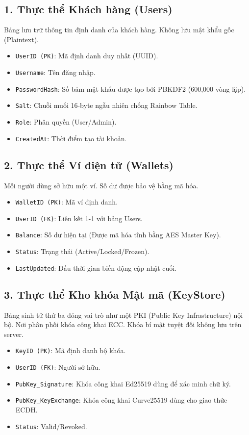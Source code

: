\documentclass[11pt,a4paper]{article}
\begin{document}
\subsection{1. Thực thể Khách hàng (Users)}
Bảng lưu trữ thông tin định danh của khách hàng. Không lưu mật khẩu gốc (Plaintext).
\begin{itemize}[noitemsep]
    \item \texttt{UserID (PK)}: Mã định danh duy nhất (UUID).
    \item \texttt{Username}: Tên đăng nhập.
    \item \texttt{PasswordHash}: Số băm mật khẩu được tạo bởi PBKDF2 (600,000 vòng lặp).
    \item \texttt{Salt}: Chuỗi muối 16-byte ngẫu nhiên chống Rainbow Table.
    \item \texttt{Role}: Phân quyền (User/Admin).
    \item \texttt{CreatedAt}: Thời điểm tạo tài khoản.
\end{itemize}

\subsection{2. Thực thể Ví điện tử (Wallets)}
Mỗi người dùng sở hữu một ví. Số dư được bảo vệ bằng mã hóa.
\begin{itemize}[noitemsep]
    \item \texttt{WalletID (PK)}: Mã ví định danh.
    \item \texttt{UserID (FK)}: Liên kết 1-1 với bảng Users.
    \item \texttt{Balance}: Số dư hiện tại (Được mã hóa tĩnh bằng AES Master Key).
    \item \texttt{Status}: Trạng thái (Active/Locked/Frozen).
    \item \texttt{LastUpdated}: Dấu thời gian biến động cập nhật cuối.
\end{itemize}

\subsection{3. Thực thể Kho khóa Mật mã (KeyStore)}
Bảng sinh tử thứ ba đóng vai trò như một PKI (Public Key Infrastructure) nội bộ. Nơi phân phối khóa công khai ECC. Khóa bí mật tuyệt đối không lưu trên server.
\begin{itemize}[noitemsep]
    \item \texttt{KeyID (PK)}: Mã định danh bộ khóa.
    \item \texttt{UserID (FK)}: Người sở hữu.
    \item \texttt{PubKey\_Signature}: Khóa công khai Ed25519 dùng để xác minh chữ ký.
    \item \texttt{PubKey\_KeyExchange}: Khóa công khai Curve25519 dùng cho giao thức ECDH.
    \item \texttt{Status}: Valid/Revoked.
\end{itemize}
\end{document}
